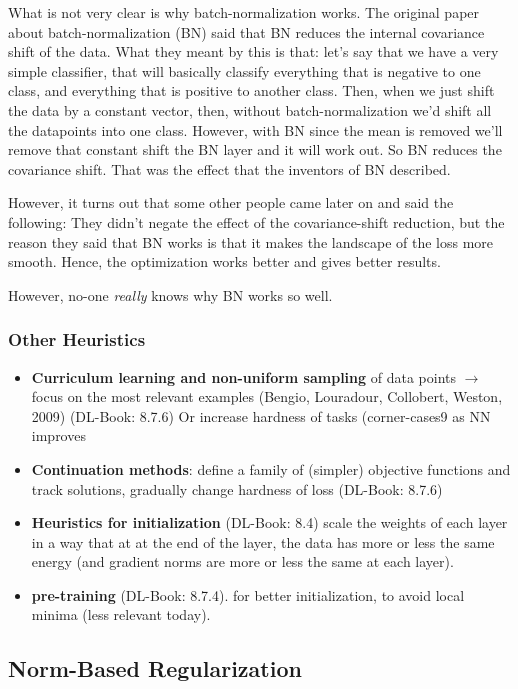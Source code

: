 \documentclass[a2paper,8pt]{extarticle}
\begin{document}
\begin{landscape}
\begin{multicols*}{7}
What is not very clear is why batch-normalization works. The original paper
about batch-normalization (BN) said that BN reduces the internal covariance
shift of the data. What they meant by this is that: let's say that we have a
very simple classifier, that will basically classify everything that is negative
to one class, and everything that is positive to another class. Then, when we
just shift the data by a constant vector, then, without batch-normalization we'd
shift all the datapoints into one class. However, with BN since the mean is
removed we'll remove that constant shift the BN layer and it will work out. So
BN reduces the covariance shift. That was the effect that the inventors of BN
described.

However, it turns out that some other people came later on and said the
following: They didn't negate the effect of the covariance-shift reduction, but
the reason they said that BN works is that it makes the landscape of the loss
more smooth. Hence, the optimization works better and gives better results.

However, no-one \emph{really} knows why BN works so well.

\subsubsection{Other Heuristics}

\begin{itemize}
  \item \textbf{Curriculum learning and non-uniform sampling} of data points
  $\to$ focus on the most relevant examples (Bengio, Louradour, Collobert,
  Weston, 2009) (DL-Book: 8.7.6) Or increase hardness of tasks (corner-cases9 as
  NN improves\\
  \item \textbf{Continuation methods}: define a family of (simpler) objective
  functions and track solutions, gradually change hardness of loss (DL-Book:
  8.7.6)
  \item \textbf{Heuristics for initialization} (DL-Book: 8.4)
  scale the weights of each layer in a way that at at the end of the layer, the
  data has more or less the same energy (and gradient norms are more or less
  the same at each layer).
  \item \textbf{pre-training} (DL-Book: 8.7.4). for better initialization, to
  avoid local minima (less relevant today).
\end{itemize}

\subsection{Norm-Based Regularization}


\end{multicols*}
\end{landscape}
\end{document}
